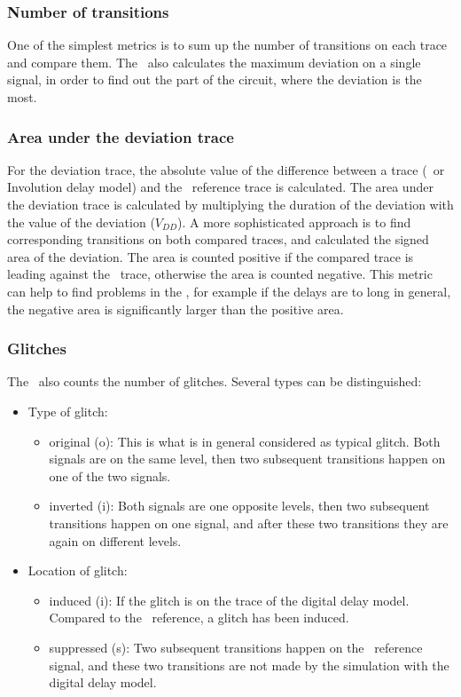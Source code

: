 \subsubsection{Number of transitions}
One of the simplest metrics is to sum up the number of transitions on each 
trace and compare them. The \invt\ also calculates the maximum deviation on a 
single signal, in order to find out the part of the circuit, where the 
deviation is the most. 

\subsubsection{Area under the deviation trace}
For the deviation trace, the absolute value of the difference between a trace 
(\modelsim\ or Involution delay model) and the \spice\ reference trace is 
calculated. The area under the deviation trace is calculated by multiplying the 
duration of the deviation with the value of the deviation ($V_{DD}$).
A more sophisticated approach is to find corresponding transitions on both 
compared traces, and calculated the signed area of the deviation. The area is 
counted positive if the compared trace is leading against the \spice\ trace, 
otherwise the area is counted negative. This metric can help to find problems 
in the \sdffile, for example if the delays are to long in general, the negative 
area is significantly larger than the positive area.

\subsubsection{Glitches}
The \invt\ also counts the number of glitches. Several types can be 
distinguished:

\begin{itemize}
	\item Type of glitch:
	\begin{itemize}
		\item original (o): This is what is in general considered as typical 
		glitch. Both signals are on the same level, then two subsequent 
		transitions happen on one of the two signals.
		\item inverted (i): Both signals are one opposite levels, then two 
		subsequent transitions happen on one signal, and after these two 
		transitions they are again on different levels.
	\end{itemize}
	\item Location of glitch:
	\begin{itemize}
		\item induced (i): If the glitch is on the trace of the digital delay 
		model. Compared to the \spice\ reference, a glitch has been induced.
		\item suppressed (s): Two subsequent transitions happen on the \spice\ 
		reference signal, and these two transitions are not made by the 
		simulation with the digital delay model.
	\end{itemize}
	
\end{itemize}

